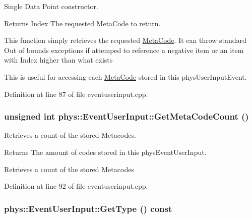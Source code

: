 Single Data Point constructor. 

\begin{DoxyReturn}{Returns}
Index The requested \hyperlink{classphys_1_1MetaCode}{MetaCode} to return.
\end{DoxyReturn}
This function simply retrieves the requested \hyperlink{classphys_1_1MetaCode}{MetaCode}. It can throw standard Out of bounds exceptions if attemped to reference a negative item or an item with Index higher than what exists \par
 This is useful for accessing each \hyperlink{classphys_1_1MetaCode}{MetaCode} stored in this physUserInputEvent. 

Definition at line 87 of file eventuserinput.cpp.

\hypertarget{classphys_1_1EventUserInput_a17aa65dcf0ef8689affa50232eec4ccb}{
\subsubsection[{GetMetaCodeCount}]{\setlength{\rightskip}{0pt plus 5cm}unsigned int phys::EventUserInput::GetMetaCodeCount ()}}
\label{d7/df5/classphys_1_1EventUserInput_a17aa65dcf0ef8689affa50232eec4ccb}


Retrieves a count of the stored Metacodes. 

\begin{DoxyReturn}{Returns}
The amount of codes stored in this physEventUserInput.
\end{DoxyReturn}
Retrieves a count of the stored Metacodes 

Definition at line 92 of file eventuserinput.cpp.

\hypertarget{classphys_1_1EventUserInput_a3e803a8d9bcc1576fe04d2245a86ec80}{
\subsubsection[{GetType}]{ phys::EventUserInput::GetType () const}}
\label{d7/df5/classphys_1_1EventUserInput_a3e803a8d9bcc1576fe04d2245a86ec80}


